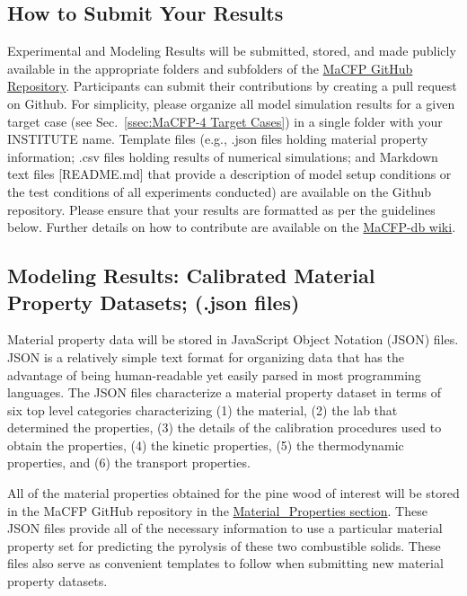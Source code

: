 \documentclass[12pt]{article}
\begin{document}
\subsection{How to Submit Your Results}
Experimental and Modeling Results will be submitted, stored, and made publicly available in the appropriate folders and subfolders of the \href{https://github.com/MaCFP/}{MaCFP GitHub Repository}. Participants can submit their contributions by creating a pull request on Github. For simplicity, please organize all model simulation results for a given target case (see Sec.~\ref{ssec:MaCFP-4 Target Cases}) in a single folder with your INSTITUTE name.  Template files (e.g., .json files holding material property information; .csv files holding results of numerical simulations; and Markdown text files [README.md] that provide a description of model setup conditions or the test conditions of all experiments conducted) are available on the Github repository. Please ensure that your results are formatted as per the guidelines below. Further details on how to contribute are available on the \href{https://github.com/MaCFP/macfp-db/wiki/How-to-Contribute}{MaCFP-db wiki}.

\subsection{Modeling Results: Calibrated Material Property Datasets; (.json files)}

Material property data will be stored in JavaScript Object Notation (JSON) files. JSON is a relatively simple text format for organizing data that has the advantage of being human-readable yet easily parsed in most programming languages. The JSON files characterize a material property dataset in terms of six top level categories characterizing (1) the material, (2) the lab that determined the properties, (3) the details of the calibration procedures used to obtain the properties, (4) the kinetic properties, (5) the thermodynamic properties, and (6) the transport properties.

All of the material properties obtained for the pine wood of interest will be stored in the MaCFP GitHub repository in the \href{https://github.com/MaCFP/matl-db/tree/master/Wood/Material_Properties}{Material\_Properties section}. These JSON files provide all of the necessary information to use a particular material property set for predicting the pyrolysis of these two combustible solids. These files also serve as convenient templates to follow when submitting new material property datasets.
\end{document}
